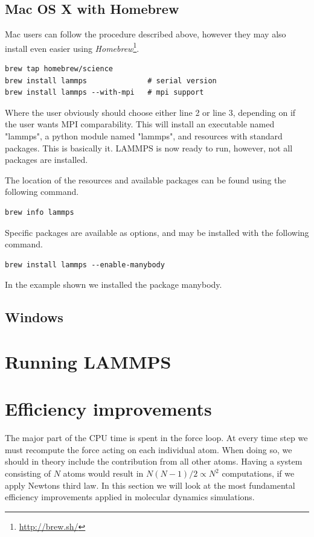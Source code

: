 \documentclass[twoside,english]{uiofysmaster}
\begin{document}
\subsection{Mac OS X with Homebrew}
Mac users can follow the procedure described above, however they may also install even easier using \textit{Homebrew}\footnote{\href{http://brew.sh/}{http://brew.sh/}}. 
\begin{lstlisting}
brew tap homebrew/science
brew install lammps              # serial version
brew install lammps --with-mpi   # mpi support 
\end{lstlisting}
Where the user obviously should choose either line 2 or line 3, depending on if the user wants MPI comparability.
This will install an executable named "lammps", a python module named "lammps", and resources with standard packages. 
This is basically it. LAMMPS is now ready to run, however, not all packages are installed.

The location of the resources and available packages can be found using the following command.
\begin{lstlisting}
brew info lammps 
\end{lstlisting}
Specific packages are available as options, and may be installed with the following command.

\begin{lstlisting}
brew install lammps --enable-manybody 
\end{lstlisting}
In the example shown we installed the package manybody.


\subsection{Windows}



\section{Running LAMMPS}


\section{Efficiency improvements}
The major part of the CPU time is spent in the force loop. 
At every time step we must recompute the force acting on each individual atom. 
When doing so, we should in theory include the contribution from all other atoms. 
Having a system consisting of $N$ atoms would result in $N(N-1)/2 \propto N^2$ computations, if we apply Newtons third law.
In this section we will look at the most fundamental efficiency improvements applied in molecular dynamics simulations.
\end{document}
